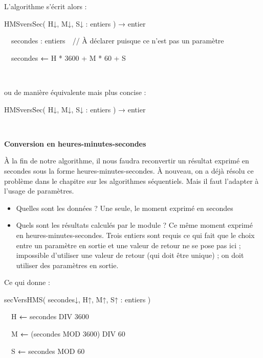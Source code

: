 {
L'algorithme s'écrit alors :}

{\sffamily
{} HMSversSec( H{↓},
M{↓}, S{↓ :} entiers )
{→}{ entier}}

{\sffamily
\ \ secondes : entiers\ \ // À déclarer puisque ce
n'est pas un paramètre}

{\sffamily
{\ \ secondes
}{\textbf{←}}{ H * 3600
+ M * 60 + S}}

{\sffamily
{\ \ }}

{\sffamily
{}}

{
ou de manière équivalente mais plus concise :}

{\sffamily
{} HMSversSec( H{↓},
M{↓}, S{↓ :} entiers )
{→}{ entier}}

{\sffamily
{\ \ }}

{\sffamily
{}}


\bigskip

{\sffamily\bfseries
Conversion en heures-minutes-secondes}

{
À la fin de notre algorithme, il nous faudra reconvertir un résultat
exprimé en secondes sous la forme heures-minutes-secondes. À nouveau,
on a déjà résolu ce problème dans le chapitre sur les algorithmes
séquentiels. Mais il faut l'adapter à
l'usage de paramètres.}

\liststyleListv
\begin{itemize}
\item {
Quelles sont les données ? Une seule, le moment exprimé en secondes}
\item {
Quels sont les résultats calculés par le module ? Ce même moment exprimé
en heures-minutes-secondes. Trois entiers sont requis ce qui fait que
le choix entre un paramètre en sortie et une valeur de retour ne se
pose pas ici ; impossible d'utiliser une valeur de
retour (qui doit être unique) ; on doit utiliser des paramètres en
sortie.}
\end{itemize}
{
Ce qui donne :}

{\sffamily
{} secVersHMS( secondes{↓},
H{↑}, M{↑},
S{↑ :} entiers )}

{\sffamily
{\ \ H
}{\textbf{←}}{ secondes
}{DIV}{ 3600}}

{\sffamily
{\ \ M
}{\textbf{←}}{
(secondes }{MOD}{ 3600)
}{DIV}{ 60}}

{\sffamily
{\ \ S
}{\textbf{←}}{ secondes
}{MOD}{ 60}}

